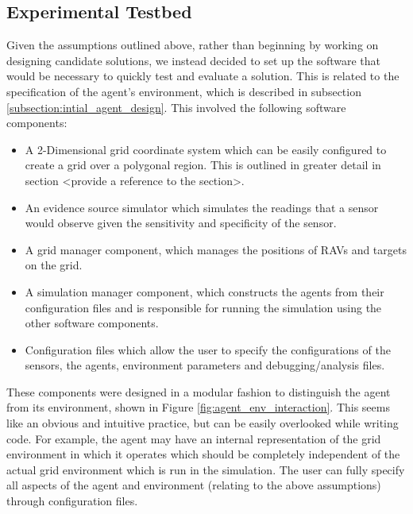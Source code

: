 \subsection{Experimental Testbed}
Given the assumptions outlined above, rather than beginning by working on designing candidate solutions, we instead decided to set up the software that would be necessary to quickly test and evaluate a solution. This is related to the specification of the agent's environment, which is described in subsection \ref{subsection:intial_agent_design}. This involved the following software components:
\begin{itemize}
    \item A 2-Dimensional grid coordinate system which can be easily configured to create a grid over a polygonal region. This is outlined in greater detail in section <provide a reference to the section>.
    \item An evidence source simulator which simulates the readings that a sensor would observe given the sensitivity and specificity of the sensor.
    \item A grid manager component, which manages the positions of RAVs and targets on the grid.
    \item A simulation manager component, which constructs the agents from their configuration files and is responsible for running the simulation using the other software components.
    \item Configuration files which allow the user to specify the configurations of the sensors, the agents, environment parameters and debugging/analysis files.
\end{itemize}
These components were designed in a modular fashion to distinguish the agent from its environment, shown in Figure \ref{fig:agent_env_interaction}. This seems like an obvious and intuitive practice, but can be easily overlooked while writing code. For example, the agent may have an internal representation of the grid environment in which it operates which should be completely independent of the actual grid environment which is run in the simulation. The user can fully specify all aspects of the agent and environment (relating to the above assumptions) through configuration files. 

